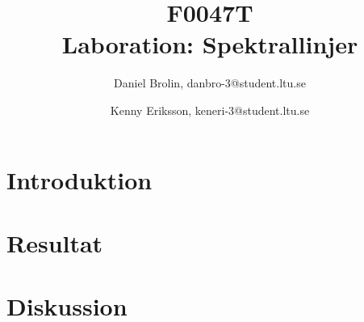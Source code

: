 \documentclass{article}
\title{F0047T\\Laboration: Spektrallinjer}
\author{Daniel Brolin, danbro-3@student.ltu.se \and Kenny Eriksson, keneri-3@student.ltu.se}
\numberwithin{equation}{section}
\begin{document}
\maketitle
\newpage

\begin{abstract}

\end{abstract}
\newpage


\setcounter{page}{1}

\section{Introduktion}

\newpage

\section{Resultat}

\newpage

\section{Diskussion}

\end{document}
